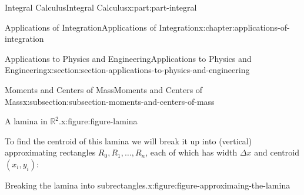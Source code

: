 \documentclass[twoside,10pt,]{tufte-book}
\numberwithin{equation}{part}
\begin{document}
\begin{partptx}{Integral Calculus}{}{Integral Calculus}{}{}{x:part:part-integral}
\begin{chapterptx}{Applications of Integration}{}{Applications of Integration}{}{}{x:chapter:applications-of-integration}
\begin{sectionptx}{Applications to Physics and Engineering}{}{Applications to Physics and Engineering}{}{}{x:section:section-applications-to-physics-and-engineering}
\begin{subsectionptx}{Moments and Centers of Mass}{}{Moments and Centers of Mass}{}{}{x:subsection:subsection-moments-and-centers-of-mass}
\begin{figureptx}{A lamina in \(\mathbb{R}^{2}\).}{x:figure:figure-lamina}{}
\begin{image}{0}{1}{0}
{
}%
\end{image}%
\tcblower
\end{figureptx}%
To find the centroid of this lamina we will break it up into (vertical) approximating rectangles \(R_{0},R_{1},\ldots,R_{n}\), each of which has width \(\Delta x\) and centroid \((x_{i},y_{i})\):%
\begin{figureptx}{Breaking the lamina into subrectangles.}{x:figure:figure-approximaing-the-lamina}{}%
\begin{image}{0}{1}{0}%
\end{image}
\end{figureptx}
\end{subsectionptx}
\end{sectionptx}
\end{chapterptx}
\end{partptx}
\end{document}
